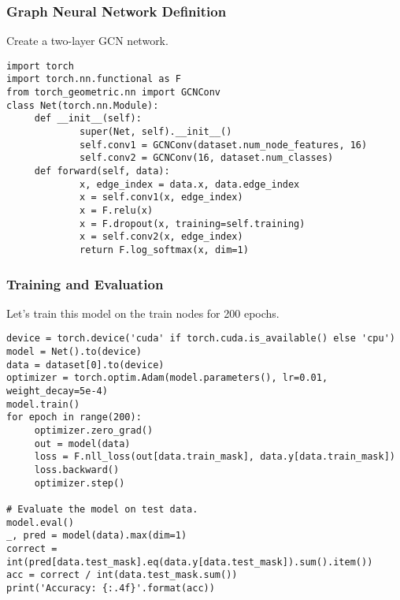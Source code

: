 \begin{frame}[fragile]\frametitle{Graph Neural Network Definition}

Create a two-layer GCN network.

\begin{lstlisting}
import torch
import torch.nn.functional as F
from torch_geometric.nn import GCNConv
class Net(torch.nn.Module):
	 def __init__(self):
			 super(Net, self).__init__()
			 self.conv1 = GCNConv(dataset.num_node_features, 16)
			 self.conv2 = GCNConv(16, dataset.num_classes)
	 def forward(self, data):
			 x, edge_index = data.x, data.edge_index
			 x = self.conv1(x, edge_index)
			 x = F.relu(x)
			 x = F.dropout(x, training=self.training)
			 x = self.conv2(x, edge_index)
			 return F.log_softmax(x, dim=1) 
\end{lstlisting}

\end{frame}
\begin{frame}[fragile]\frametitle{Training and Evaluation}

Let’s train this model on the train nodes for 200 epochs.

\begin{lstlisting}
device = torch.device('cuda' if torch.cuda.is_available() else 'cpu')
model = Net().to(device)
data = dataset[0].to(device)
optimizer = torch.optim.Adam(model.parameters(), lr=0.01, weight_decay=5e-4)
model.train()
for epoch in range(200):
	 optimizer.zero_grad()
	 out = model(data)
	 loss = F.nll_loss(out[data.train_mask], data.y[data.train_mask])
	 loss.backward()
	 optimizer.step() 
	 
# Evaluate the model on test data.
model.eval()
_, pred = model(data).max(dim=1)
correct = int(pred[data.test_mask].eq(data.y[data.test_mask]).sum().item())
acc = correct / int(data.test_mask.sum())
print('Accuracy: {:.4f}'.format(acc)) 	 
\end{lstlisting}

\end{frame}
